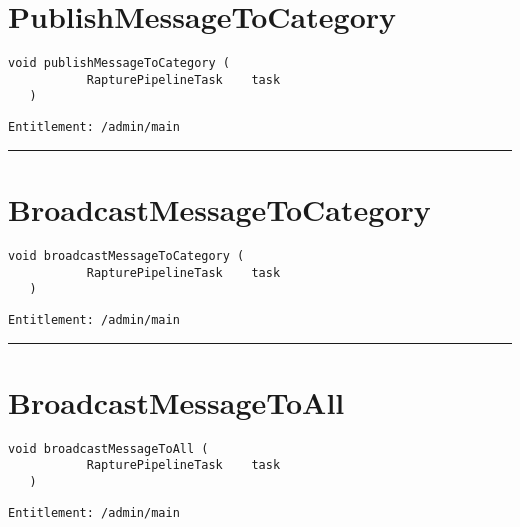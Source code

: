 \section{PublishMessageToCategory}
\label{Api:PublishMessageToCategory}
\begin{lstlisting}[style=nonumbers]
   void publishMessageToCategory (
           RapturePipelineTask    task
   )
\end{lstlisting}
\begin{Verbatim}[formatcom=\color{Maroon}]
  Entitlement: /admin/main
\end{Verbatim}



\rule{12cm}{2pt}
\section{BroadcastMessageToCategory}
\label{Api:BroadcastMessageToCategory}
\begin{lstlisting}[style=nonumbers]
   void broadcastMessageToCategory (
           RapturePipelineTask    task
   )
\end{lstlisting}
\begin{Verbatim}[formatcom=\color{Maroon}]
  Entitlement: /admin/main
\end{Verbatim}



\rule{12cm}{2pt}
\section{BroadcastMessageToAll}
\label{Api:BroadcastMessageToAll}
\begin{lstlisting}[style=nonumbers]
   void broadcastMessageToAll (
           RapturePipelineTask    task
   )
\end{lstlisting}
\begin{Verbatim}[formatcom=\color{Maroon}]
  Entitlement: /admin/main
\end{Verbatim}



